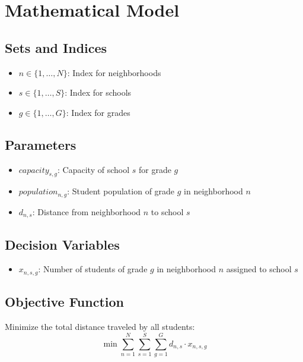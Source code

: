 \documentclass{article}
\begin{document}
\section*{Mathematical Model}

\subsection*{Sets and Indices}
\begin{itemize}
    \item $n \in \{1, \ldots, N\}$: Index for neighborhoods
    \item $s \in \{1, \ldots, S\}$: Index for schools
    \item $g \in \{1, \ldots, G\}$: Index for grades
\end{itemize}

\subsection*{Parameters}
\begin{itemize}
    \item $capacity_{s,g}$: Capacity of school $s$ for grade $g$
    \item $population_{n,g}$: Student population of grade $g$ in neighborhood $n$
    \item $d_{n,s}$: Distance from neighborhood $n$ to school $s$
\end{itemize}

\subsection*{Decision Variables}
\begin{itemize}
    \item $x_{n,s,g}$: Number of students of grade $g$ in neighborhood $n$ assigned to school $s$
\end{itemize}

\subsection*{Objective Function}
Minimize the total distance traveled by all students:
\[
\min \sum_{n=1}^{N} \sum_{s=1}^{S} \sum_{g=1}^{G} d_{n,s} \cdot x_{n,s,g}
\]
\end{document}
